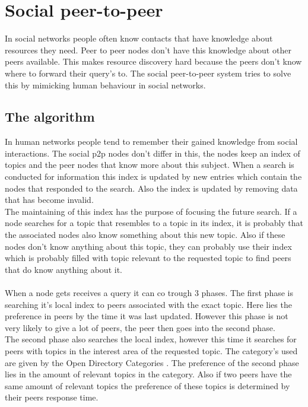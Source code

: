 \section{Social peer-to-peer}
	In social networks people often know contacts that have knowledge about resources they need.
	Peer to peer nodes don't have this knowledge about other peers available.
	This makes resource discovery hard because the peers don't know where to forward their query's to.
	The social peer-to-peer system tries to solve this by mimicking human behaviour in social networks.\\
	
	\subsection{The algorithm}
		In human networks people tend to remember their gained knowledge from social interactions.
		The social p2p nodes don't differ in this, the nodes keep an index of topics and the peer nodes that know more about this subject.
		When a search is conducted for information this index is updated by new entries which contain the nodes that responded to the search.
		Also the index is updated by removing data that has become invalid.\\
		The maintaining of this index has the purpose of focusing the future search.
		If a node searches for a topic that resembles to a topic in its index, it is probably that the associated nodes also know something about this new topic.
		Also if these nodes don't know anything about this topic, they can probably use their index which is probably filled with topic relevant to the requested topic to find peers that do know anything about it.\\
		\\
		When a node gets receives a query it can co trough 3 phases.
		The first phase is searching it's local index to peers associated with the exact topic.
		Here lies the preference in peers by the time it was last updated.
		However this phase is not very likely to give a lot of peers, the peer then goes into the second phase.\\
		The second phase also searches the local index, however this time it searches for peers with topics in the interest area of the requested topic.
		The category's used are given by the Open Directory Categories \cite{opendir}.
		The preference of the second phase lies in the amount of relevant topics in the category.
		Also if two peers have the same amount of relevant topics the preference of these topics is determined by their peers response time.
